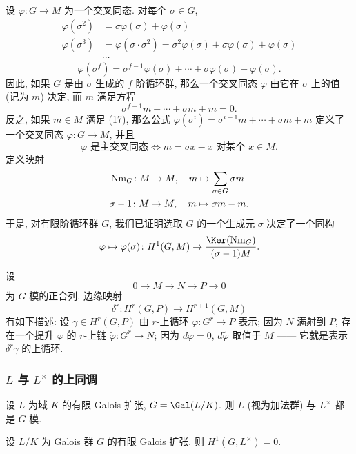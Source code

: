 \begin{example}\label{ex:ii.1.20}
设 $\varphi\colon G\to M$ 为一个交叉同态. 对每个 $\sigma\in G$,
\[
 \begin{aligned}
 \varphi(\sigma^2)&=\sigma\varphi(\sigma)+\varphi(\sigma)\\
 \varphi(\sigma^3)&=\varphi(\sigma\cdot\sigma^2)=\sigma^2\varphi(\sigma)+\sigma\varphi(\sigma)+\varphi(\sigma)\\
 &\cdots
 \end{aligned}
\]
\[
 \varphi(\sigma^f)=\sigma^{f-1}\varphi(\sigma)+\cdots+\sigma\varphi(\sigma)+\varphi(\sigma).
\]
因此, 如果 $G$ 是由 $\sigma$ 生成的 $f$ 阶循环群, 那么一个交叉同态 $\varphi$ 由它在 $\sigma$ 上的值 (记为 $m$) 决定, 而 $m$ 满足方程
\begin{equation*}
 \sigma^{f-1}m+\cdots+\sigma m+m=0.
\tag{17}
\end{equation*}
反之, 如果 $m\in M$ 满足 (17), 那么公式 $\varphi(\sigma^i)=\sigma^{i-1}m+\cdots+\sigma m+m$ 定义了一个交叉同态 $\varphi\colon G\to M$, 并且
\[
 \varphi\text{ 是主交叉同态}\iff m=\sigma x-x\text{ 对某个 }x\in M.
\]
定义映射
\[
 \begin{aligned}
 &\operatorname{Nm}_G\colon M\to M,\quad m\mapsto \sum_{\sigma\in G}\sigma m\\
 &\sigma-1\colon M\to M,\quad m\mapsto \sigma m-m.
 \end{aligned}
\]
于是, 对有限阶循环群 $G$, 我们已证明选取 $G$ 的一个生成元 $\sigma$ 决定了一个同构
\[
 \varphi\mapsto\varphi(\sigma)\colon H^1(G,M)\to \frac{\Ker(\Nm_G)}{(\sigma-1)M}.
\]
\end{example}

\begin{remark}\label{rem:ii.1.21}
设
\[
 0\to M\to N\to P\to 0
\]
为 $G$-模的正合列. 边缘映射
\[
 \delta^r\colon H^r(G,P)\to H^{r+1}(G,M)
\]
有如下描述: 设 $\gamma\in H^r(G,P)$ 由 $r$-上循环 $\varphi\colon G^r\to P$ 表示; 因为 $N$ 满射到 $P$, 存在一个提升 $\varphi$ 的 $r$-上链 $\tilde\varphi\colon G^r\to N$; 因为 $d\varphi=0$, $d\tilde\varphi$ 取值于 $M$ —— 它就是表示 $\delta^r\gamma$ 的上循环.
\end{remark}

\subsubsection*{$L$ 与 $L^\times$ 的上同调}

设 $L$ 为域 $K$ 的有限 Galois 扩张, $G=\Gal(L/K)$. 则 $L$ (视为加法群) 与 $L^\times$ 都是 $G$-模.

\begin{proposition}\label{prop:ii.1.22}
设 $L/K$ 为 Galois 群 $G$ 的有限 Galois 扩张. 则 $H^1(G,L^\times)=0$.
\end{proposition}

